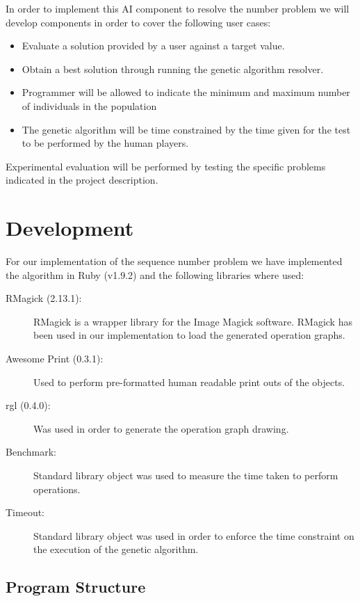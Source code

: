 \documentclass[a4paper,10pt,titlepage]{article}
\begin{document}
\par In order to implement this AI component to resolve the number problem we will develop components in order to cover the following user cases:

\begin{itemize}
	\item Evaluate a solution provided by a user against a target value.
	\item Obtain a best solution through running the genetic algorithm resolver. 
	\item Programmer will be allowed to indicate the minimum and maximum number of individuals in the population
	\item The genetic algorithm will be time constrained by the time given for the test to be performed by the human players.
\end{itemize}

\par Experimental evaluation will be performed by testing the specific problems indicated in the project description. 

\section{Development}
\par For our implementation of the sequence number problem we have implemented the algorithm in Ruby (v1.9.2) and the following libraries where used: 
\begin{description}
	\item[RMagick (2.13.1):] RMagick is a wrapper library for the Image Magick software. RMagick has been used in our implementation to load the generated operation graphs.  
	\item[Awesome Print (0.3.1):] Used to perform pre-formatted human readable print outs of the objects.
	\item[rgl (0.4.0):] Was used in order to generate the operation graph drawing.
	\item[Benchmark:] Standard library object was used to measure the time taken to perform operations.
	\item[Timeout:] Standard library object was used in order to enforce the time constraint on the execution of the genetic algorithm.
\end{description}

\subsection{Program Structure}
\end{document}
